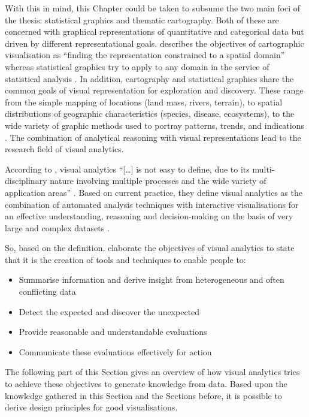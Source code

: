 With this in mind, this Chapter could be taken to subsume the two main foci of the thesis: statistical graphics and thematic cartography. Both of these are concerned with graphical representations of quantitative and categorical data but driven by different representational goals. \citeauthor{Friendly.2001} describes the objectives of cartographic visualisation as ``finding the representation constrained to a spatial domain'' whereas statistical graphics try to apply to any domain in the service of statistical analysis . In addition, cartography and statistical graphics share the common goals of visual representation for exploration and discovery. These range from the simple mapping of locations (land mass, rivers, terrain), to spatial distributions of geographic characteristics (species, disease, ecosystems), to the wide variety of graphic methods used to portray patterns, trends, and indications . The combination of analytical reasoning with visual representations lead to the research field of visual analytics.

According to \citeauthor{Keim2010}, visual analytics ``[\ldots] is not easy to define, due to its multi-disciplinary nature involving multiple processes and the wide variety of application areas'' . Based on current practice, they define visual analytics as the combination of automated analysis techniques with interactive visualisations for an effective understanding, reasoning and decision-making on the basis of very large and complex datasets .

So, based on the definition, \citeauthor{Keim2010} elaborate the objectives of visual analytics to state that it is the creation of tools and techniques to enable people to:

\begin{itemize}
\item Summarise information and derive insight from heterogeneous and often conflicting data
\item Detect the expected and discover the unexpected
\item Provide reasonable and understandable evaluations
\item Communicate these evaluations effectively for action
\end{itemize}

The following part of this Section gives an overview of how visual analytics tries to achieve these objectives to generate knowledge from data. Based upon the knowledge gathered in this Section and the Sections before, it is possible to derive design principles for good visualisations.

